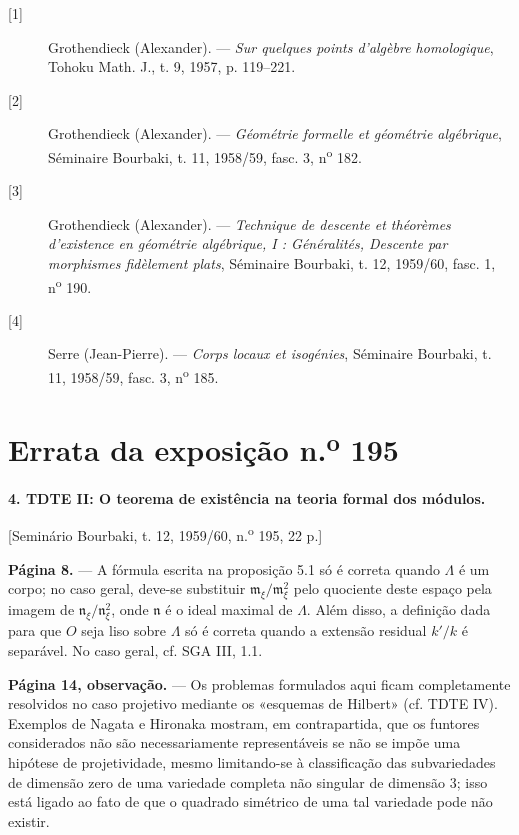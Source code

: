 \documentclass[11pt,twoside,openany]{book}
\numberwithin{equation}{section}
\newcommand{\src}[1]{%
  \phantomsection\hypertarget{src:#1}{}%
  \marginpar{\raggedleft\footnotesize\sffamily #1}%
}
\newcommand{\sid}[1]{\phantomsection\hypertarget{fga:#1}{}}
\theoremstyle{plain}
\theoremstyle{definition}
\theoremstyle{remark}
\newcommand{\FgaUnitKey}{frontmatter}
\renewcommand{\src}[1]{%
  \phantomsection\hypertarget{src:\FgaUnitKey:#1}{}%
  \marginpar{\raggedleft\footnotesize\sffamily #1}%
}
\begin{document}
\begin{description}
  \item[{[1]}] Grothendieck (Alexander). --- \emph{Sur quelques points
    d'algèbre homologique}, Tohoku Math. J., t. 9, 1957, p. 119--221.
  \item[{[2]}] Grothendieck (Alexander). --- \emph{Géométrie formelle et
    géométrie algébrique}, Séminaire Bourbaki, t. 11, 1958/59, fasc. 3,
    n\textsuperscript{o} 182.
  \item[{[3]}] Grothendieck (Alexander). --- \emph{Technique de descente et
    théorèmes d'existence en géométrie algébrique, I : Généralités, Descente
    par morphismes fidèlement plats}, Séminaire Bourbaki, t. 12, 1959/60,
    fasc. 1, n\textsuperscript{o} 190.
  \item[{[4]}] Serre (Jean-Pierre). --- \emph{Corps locaux et isogénies},
    Séminaire Bourbaki, t. 11, 1958/59, fasc. 3, n\textsuperscript{o} 185.
\end{description}

\par

\def\FgaUnitKey{e195}\clearpage
\chapter*{Errata da exposição n.\textsuperscript{o} 195}
\setcounter{footnote}{0}
\sid{e195}
\src{300}

\noindent\textbf{4. TDTE II: O teorema de existência na teoria formal dos
módulos.}

\begin{center}
[Seminário Bourbaki, t. 12, 1959/60, n.\textsuperscript{o} 195, 22 p.]
\end{center}

\noindent\textbf{Página 8.} --- A fórmula escrita na proposição 5.1 só é
correta quando $\Lambda$ é um corpo; no caso geral, deve-se substituir
$\mathfrak m_\xi/\mathfrak m_\xi^2$ pelo quociente deste espaço pela
imagem de $\mathfrak n_\xi/\mathfrak n_\xi^2$, onde $\mathfrak n$ é o ideal
maximal de $\Lambda$. Além disso, a definição dada para que $O$ seja liso sobre
$\Lambda$ só é correta quando a extensão residual $k'/k$ é separável.
No caso geral, cf. SGA III, 1.1.

\noindent\textbf{Página 14, observação.} --- Os problemas formulados aqui
ficam completamente resolvidos no caso projetivo mediante os «esquemas de
Hilbert» (cf. TDTE IV). Exemplos de Nagata e Hironaka mostram, em contrapartida, que
os funtores considerados não são necessariamente representáveis se não se impõe
uma hipótese de projetividade, mesmo limitando-se à classificação das
subvariedades de dimensão zero de uma variedade completa não singular de
dimensão 3; isso está ligado ao fato de que o quadrado simétrico de uma
tal variedade pode não existir.
\end{document}
